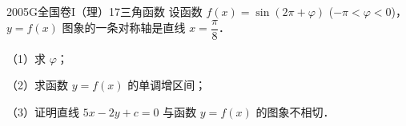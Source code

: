 
\begin{problem}{2005}{G}{全国卷I（理）}{17}{三角函数}
设函数 $ f(x)=\sin(2\pi+\varphi) $ ($ -\pi<\varphi<0 $)，$ y=f(x) $ 图象的一条对称轴是直线 $ x=\dfrac{\pi}{8} $．

（1）求 $ \varphi $；

（2）求函数 $ y=f(x) $ 的单调增区间；

（3）证明直线 $ 5x-2y+c=0 $ 与函数 $ y=f(x) $ 的图象不相切．
\end{problem}

\begin{answer}

\end{answer}

\begin{solutions}

\end{solutions}